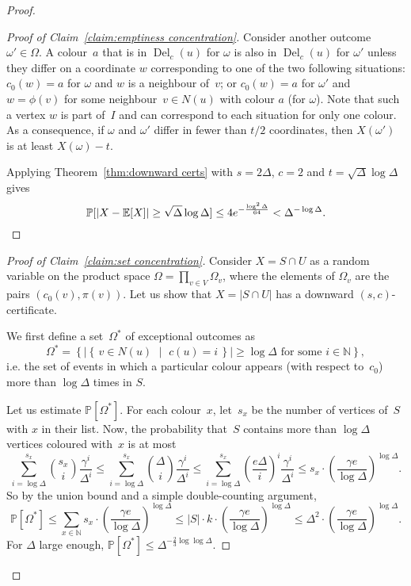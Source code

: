 \documentclass[11pt]{article}
\theoremstyle{plain}
\DeclareMathOperator{\Del}{Del}
\newcommand{\del}{\Del_c}
\newcommand{\Prob}{\mathbb{P}}
\newcommand{\sst}[2]{\left\{\,#1 \,\,\middle|\,\, #2\,\right\}}
\newcommand{\E}{\mathbb{E}}
\newcommand{\N}{\mathbb{N}}
\begin{document}
\begin{proof}
\begin{proof}[Proof of Claim~\ref{claim:emptiness concentration}]
  Consider another outcome~$\omega'\in\Omega$.
  A colour~$a$ that is in $\del(u)$ for $\omega$ is also in $\del(u)$ for $\omega'$
  unless they differ on a coordinate $w$ corresponding to one of the two following
  situations:
  $c_0(w)=a$ for $\omega$ and $w$ is a neighbour of~$v$; or
  $c_0(w)=a$ for $\omega'$ and $w=\phi(v)$ for some neighbour~$v\in N(u)$ with colour $a$
  (for $\omega$).
  Note that such a vertex $w$ is part of~$I$ and can correspond to each situation for
  only one colour.
  As a consequence, if $\omega$ and $\omega'$ differ in fewer than $t/2$ coordinates,
  then $X(\omega')$ is at least $X(\omega)-t$.

  Applying Theorem~\ref{thm:downward certs} with $s=2\Delta$, $c=2$ and $t=\sqrt{\Delta}\log\Delta$ gives
\[
\Prob[|X-\E[X]|\ge \sqrt{\Delta}\log\Delta]
\le 4e^{-\frac{\log^2\Delta}{64}}< \Delta^{-\log\Delta}.\qedhere
\]
\end{proof}

\begin{proof}[Proof of Claim~\ref{claim:set concentration}]
  Consider $X=S\cap U$ as a random variable on the product space $\Omega=\prod_{v\in V}\Omega_v$,
  where the elements of $\Omega_v$ are the pairs $(c_0(v), \pi(v))$.
  Let us show that $X=|S\cap U|$ has a downward $(s,c)$-certificate.

  We first define a set~$\Omega^*$ of exceptional outcomes as
  \[
  \Omega^*=\left\{ |\sst{v\in N(u)}{c(u)=i}| \ge \log\Delta \text{ for some } i \in \N\right\},
  \]
  i.e. the set of events in which a particular colour appears
  (with respect to~$c_0$) more than $\log\Delta$ times in $S$.

  Let us estimate $\Prob[\Omega^*]$.
  For each colour~$x$, let~$s_x$ be the number of vertices of~$S$
  with $x$ in their list.
  Now, the probability that~$S$ contains more than $\log\Delta$ vertices coloured
  with~$x$ is at most 
  \[
  \sum_{i = \log\Delta}^{s_x}{s_x \choose i}
  \frac{\gamma^i}{\Delta^i}
  \le \sum_{i = \log\Delta}^{s_x}{\Delta \choose i}
  \frac{\gamma^i}{\Delta^i}
  \le \sum_{i = \log\Delta}^{s_x} \left(\frac{e\Delta}{i}\right)^i\frac{\gamma^i}{\Delta^i}
  \le s_x \cdot \left(\frac{\gamma e}{\log\Delta}\right)^{\log\Delta}.
  \]
  So by the union bound and a simple double-counting argument,
  \[
  \Prob[\Omega^*]\le\sum_{x\in\N}s_x\cdot \left(\frac{\gamma e}{\log\Delta}\right)^{\log\Delta}
  \le |S|\cdot k\cdot\left(\frac{\gamma e}{\log\Delta}\right)^{\log\Delta}
  \le \Delta^2\cdot\left(\frac{\gamma e}{\log\Delta}\right)^{\log\Delta}.
  \]
  For $\Delta$ large enough,
  $\Prob[\Omega^*] \le \Delta^{-\frac{2}{3}\log\log\Delta}$.


\end{proof}
\end{proof}
\end{document}
